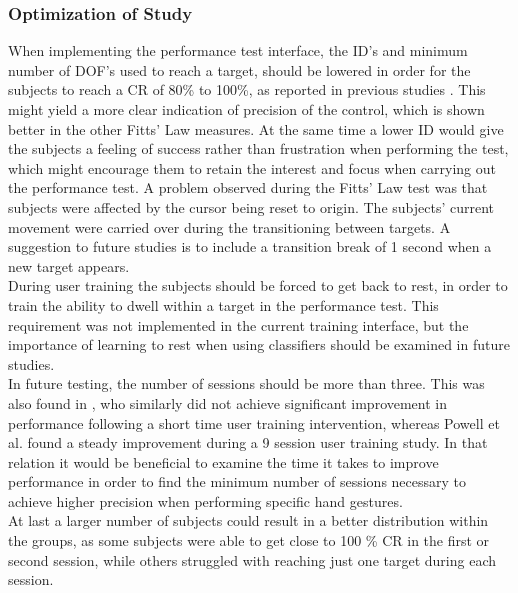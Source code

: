 \subsubsection{Optimization of Study}
When implementing the performance test interface, the ID's and minimum number of DOF's used to reach a target, should be lowered in order for the subjects to reach a CR of 80\% to 100\%, as reported in previous studies \cite{Scheme2013, Scheme2013a}. This might yield a more clear indication of precision of the control, which is shown better in the other Fitts' Law measures. At the same time a lower ID would give the subjects a feeling of success rather than frustration when performing the test, which might encourage them to retain the interest and focus when carrying out the performance test.
A problem observed during the Fitts' Law test was that subjects were affected by the cursor being reset to origin. The subjects' current movement were carried over during the transitioning between targets. A suggestion to future studies is to include a transition break of 1 second when a new target appears. \\
During user training the subjects should be forced to get back to rest, in order to train the ability to dwell within a target in the performance test. This requirement was not implemented in the current training interface, but the importance of learning to rest when using classifiers should be examined in future studies.\\
In future testing, the number of sessions should be more than three. This was also found in \cite{Pan2017}, who similarly did not achieve significant improvement in performance following a short time user training intervention, whereas Powell et al. \cite{Powell2014} found a steady improvement during a 9 session user training study. In that relation it would be beneficial to examine the time it takes to improve performance in order to find the minimum number of sessions necessary to achieve higher precision when performing specific hand gestures. \\
At last a larger number of subjects could result in a better distribution within the groups, as some subjects were able to get close to 100 \% CR in the first or second session, while others struggled with reaching just one target during each session. 
